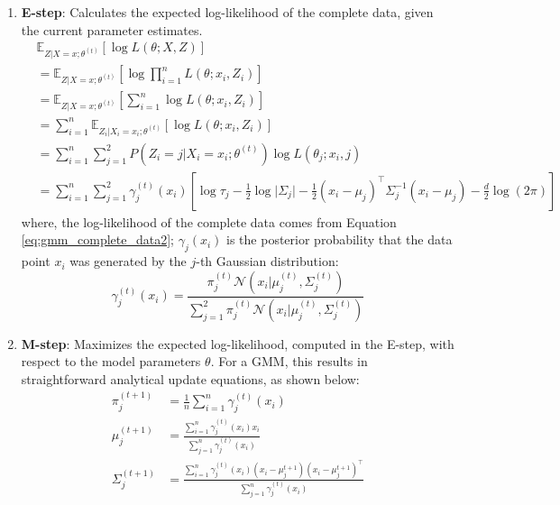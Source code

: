 \begin{enumerate}
    \item \textbf{E-step}: Calculates the expected log-likelihood of the complete data, given the current parameter estimates.
    \begin{align}
    &\mathbb{E}_{Z \vert X = x; \theta^{(t)}} \left[ \log L(\theta; X, Z) \right] \nonumber \\
    &= \mathbb{E}_{Z \vert X = x; \theta^{(t)}} \left[ \log \prod_{i=1}^n L(\theta; x_i, Z_i) \right] \nonumber \\
    &= \mathbb{E}_{Z \vert X = x; \theta^{(t)}} \left[ \sum_{i=1}^n \log L(\theta; x_i, Z_i) \right] \nonumber \\
    &= \sum_{i=1}^n \mathbb{E}_{Z_i \vert X_i = x_i; \theta^{(t)}} \left[ \log L(\theta; x_i, Z_i) \right] \nonumber \\
    &= \sum_{i=1}^n \sum_{j=1}^2 P(Z_i = j \vert X_i = x_i; \theta^{(t)}) \log L(\theta_j; x_i, j) \nonumber \\
    &= \sum_{i=1}^n \sum_{j=1}^2 \gamma_{j}^{(t)}(x_i) \left[ \log \tau_j - \frac{1}{2} \log \vert\Sigma_j\vert - \frac{1}{2} (x_i - \mu_j)^\top \Sigma_j^{-1} (x_i - \mu_j) - \frac{d}{2} \log(2\pi) \right]
    \end{align}
    where, the log-likelihood of the complete data comes from Equation \ref{eq:gmm_complete_data2}; $\gamma_{j}(x_i)$ is the posterior probability that the data point $x_i$ was generated by the $j$-th Gaussian distribution:
    \begin{equation}
        \gamma_{j}^{(t)}(x_i) = \frac{\pi_j^{(t)} \mathcal{N}(x_i \vert \mu_j^{(t)}, \Sigma_j^{(t)})}{\sum_{j=1}^{2} \pi_j^{(t)} \mathcal{N}(x_i \vert \mu_j^{(t)}, \Sigma_j^{(t)})}
    \end{equation}
    \item \textbf{M-step}: Maximizes the expected log-likelihood, computed in the E-step, with respect to the model parameters $\theta$. For a GMM, this results in straightforward analytical update equations, as shown below:
    \begin{align}
        \pi_j^{(t+1)} &= \frac{1}{n} \sum_{i=1}^{n} \gamma_{j}^{(t)}(x_i)  \nonumber \\
        \mu_j^{(t+1)} &= \frac{\sum_{i=1}^{n} \gamma_{j}^{(t)}(x_i) x_i}{\sum_{j=1}^{n} \gamma_{j}^{(t)}(x_i)} \nonumber \\
        \Sigma_j^{(t+1)} &= \frac{\sum_{i=1}^{n} \gamma_{j}^{(t)}(x_i) (x_i - \mu_j^{t+1})(x_i - \mu_j^{t+1})^\top}{\sum_{j=1}^{n} \gamma_{j}^{(t)}(x_i)}
    \end{align}
\end{enumerate}

